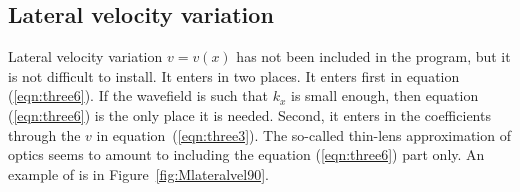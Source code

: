 \subsection{Lateral velocity variation}
\par
Lateral velocity variation  $v=v(x)$  has not been
included in the program, but it is not difficult to install.
It enters in two places.
It enters first in equation (\ref{eqn:three6}).
If the wavefield is such that  $k_x$  is small enough,
then equation (\ref{eqn:three6}) is the only place it is needed.
Second, it enters in the  coefficients
through the $v$ in equation~(\ref{eqn:three3}).
The so-called thin-lens approximation of optics seems
to amount to including the equation (\ref{eqn:three6}) part only.
An example of
is in Figure~\ref{fig:Mlateralvel90}.

